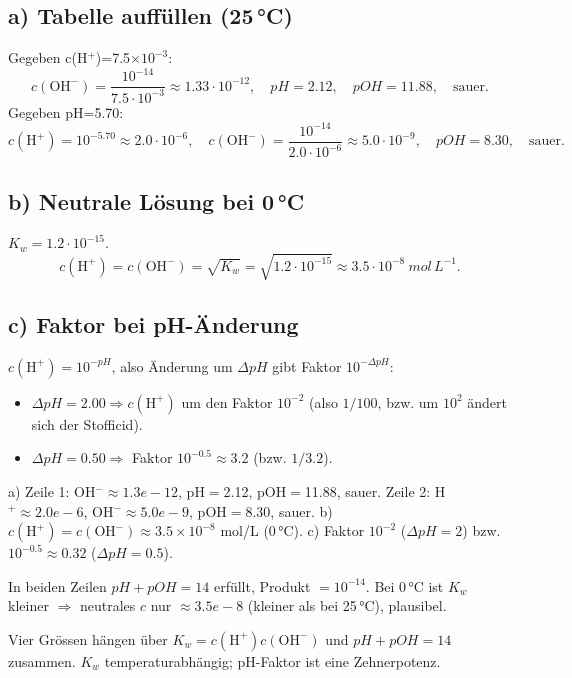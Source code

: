 
\subsection*{a) Tabelle auffüllen (25\,°C)}
Gegeben c(H$^+$)=7.5$\times10^{-3}$:
\[
  c(\mathrm{OH^-}) = \frac{10^{-14}}{7.5\cdot10^{-3}} \approx 1.33\cdot10^{-12},
  \quad pH = 2.12,\quad pOH = 11.88,\quad \text{sauer}.
\]
Gegeben pH=5.70:
\[
  c(\mathrm{H^+}) = 10^{-5.70} \approx 2.0\cdot10^{-6},
  \quad c(\mathrm{OH^-}) = \frac{10^{-14}}{2.0\cdot10^{-6}} \approx 5.0\cdot10^{-9},
  \quad pOH = 8.30,\quad \text{sauer}.
\]

\subsection*{b) Neutrale Lösung bei 0\,°C}
$K_w = 1.2\cdot10^{-15}$.
\[
  c(\mathrm{H^+}) = c(\mathrm{OH^-}) = \sqrt{K_w}
   = \sqrt{1.2\cdot10^{-15}} \approx 3.5\cdot10^{-8}\ mol\,L^{-1}.
\]

\subsection*{c) Faktor bei pH-Änderung}
$c(\mathrm{H^+})=10^{-pH}$, also Änderung um $\Delta pH$ gibt Faktor
$10^{-\Delta pH}$:
\begin{itemize}
  \item $\Delta pH = 2.00 \Rightarrow c(\mathrm{H^+})$ um den Faktor
        $10^{-2}$ (also $1/100$, bzw. um $10^2$ ändert sich der Stofficid).
  \item $\Delta pH = 0.50 \Rightarrow$ Faktor $10^{-0.5}\approx 3.2$
        (bzw. $1/3.2$).
\end{itemize}

\begin{ergebnis}
a) Zeile 1: OH$^-\approx1.3e{-}12$, pH$=$2.12, pOH$=$11.88, sauer. Zeile 2:
H$^+\approx2.0e{-}6$, OH$^-\approx5.0e{-}9$, pOH$=$8.30, sauer.
b) $c(\mathrm{H^+})=c(\mathrm{OH^-})\approx3.5\times10^{-8}$ mol/L (0\,°C).
c) Faktor $10^{-2}$ ($\Delta pH{=}2$) bzw.\ $10^{-0.5}\approx0.32$
($\Delta pH{=}0.5$).
\end{ergebnis}

\begin{kontrolle}
In beiden Zeilen $pH+pOH=14$ erfüllt, Produkt $=10^{-14}$. Bei 0\,°C ist
$K_w$ kleiner $\Rightarrow$ neutrales $c$ nur $\approx3.5e{-}8$ (kleiner als
bei 25\,°C), plausibel. 
\end{kontrolle}

\begin{merksatz}
Vier Grössen hängen über $K_w=c(\mathrm{H^+})c(\mathrm{OH^-})$ und
$pH+pOH=14$ zusammen. $K_w$ temperaturabhängig; pH-Faktor ist eine
Zehnerpotenz.
\end{merksatz}
